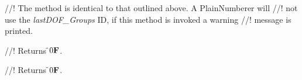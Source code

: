 //! The method is identical to that outlined above. A PlainNumberer will
//! not use the {\em lastDOF\_Groups} ID, if this method is invoked a warning
//! message is printed. 


//! Returns \f$0{\bf F}$.

//! Returns \f$0{\bf F}$.






